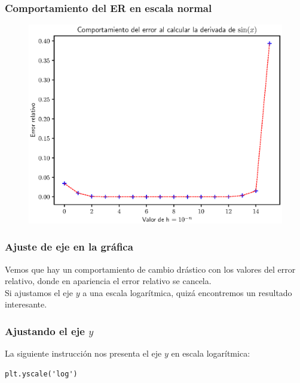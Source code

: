 \documentclass[12pt]{beamer}
\begin{document}
\begin{frame}
\frametitle{Comportamiento del ER en escala normal}
\begin{figure}
    \centering
    \includegraphics[scale=0.6]{Imagenes/Ejercicio_Derivada_00.eps}
\end{figure}
\end{frame}
\begin{frame}[fragile]
\frametitle{Ajuste de eje en la gráfica}
Vemos que hay un comportamiento de cambio drástico con los valores del error relativo, donde en apariencia el error relativo se cancela.
\\
\bigskip
\pause
Si ajustamos el eje $y$ a una escala logarítmica, quizá encontremos un resultado interesante.
\end{frame}
\begin{frame}[fragile]
\frametitle{Ajustando el eje $y$}
La siguiente instrucción nos presenta el eje $y$ en escala logarítmica:
\begin{verbatim}
plt.yscale('log')
\end{verbatim}
\end{frame}
\end{document}
